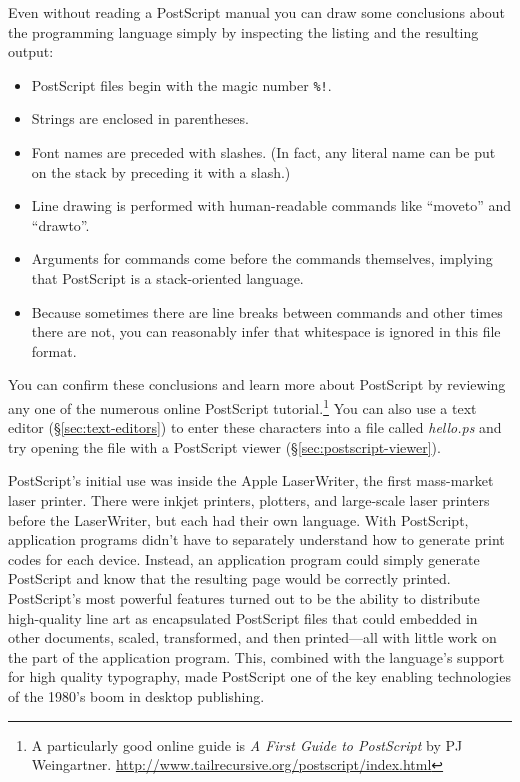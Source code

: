 \label{hello-ps-listing}

Even without reading a PostScript manual you
can draw some conclusions about the programming language simply by 
inspecting the listing and the resulting output:

\begin{itemize}
\item PostScript files begin with the magic number \verb|%!|.
\item Strings are enclosed in parentheses. 
\item Font names are preceded with slashes. (In fact, any literal name
  can be put on the stack by preceding it with a slash.)
\item Line drawing is performed with human-readable commands like
  ``moveto'' and ``drawto''. 
\item Arguments for commands come before the commands themselves,
  implying that PostScript is a stack-oriented language.
\item Because sometimes there are line breaks between commands and
  other times there are not, you can reasonably infer that whitespace
  is ignored in this file format.
\end{itemize}

You can confirm these conclusions and learn more about PostScript by
reviewing any one of the numerous online PostScript
tutorial.\footnote{A particularly good online guide is \emph{A First
    Guide to PostScript} by PJ
  Weingartner. \url{http://www.tailrecursive.org/postscript/index.html}}
You can also use a text editor (\S\ref{sec:text-editors}) to enter
these characters into a file called \emph{hello.ps} and try opening
the file with a PostScript viewer (\S\ref{sec:postscript-viewer}).

PostScript's initial use was inside the Apple LaserWriter, the first
mass-market laser printer. There were inkjet printers, plotters, and
large-scale laser printers before the LaserWriter, but each had their
own language. With PostScript, application programs didn't have to
separately understand how to generate print codes for each
device. Instead, an application program could simply generate
PostScript and know that the resulting page would be correctly
printed. PostScript's most powerful features turned out to be the
ability to distribute high-quality line art as encapsulated PostScript
files that could embedded in other documents, scaled, transformed, and
then printed---all with little work on the part of the application
program. This, combined with the language's support for high quality
typography, made PostScript one of the key enabling technologies of
the 1980's boom in desktop publishing.

